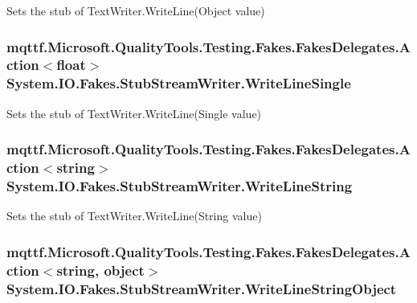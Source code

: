 Sets the stub of Text\-Writer.\-Write\-Line(\-Object value)

\hypertarget{class_system_1_1_i_o_1_1_fakes_1_1_stub_stream_writer_af2a2b9ba72906f1477432ea12d9e6abf}{
\subsubsection[{Write\-Line\-Single}]{\setlength{\rightskip}{0pt plus 5cm}mqttf.\-Microsoft.\-Quality\-Tools.\-Testing.\-Fakes.\-Fakes\-Delegates.\-Action$<$float$>$ System.\-I\-O.\-Fakes.\-Stub\-Stream\-Writer.\-Write\-Line\-Single}}\label{class_system_1_1_i_o_1_1_fakes_1_1_stub_stream_writer_af2a2b9ba72906f1477432ea12d9e6abf}


Sets the stub of Text\-Writer.\-Write\-Line(\-Single value)

\hypertarget{class_system_1_1_i_o_1_1_fakes_1_1_stub_stream_writer_a71f037719c8536f2738809bc03f3123f}{
\subsubsection[{Write\-Line\-String}]{\setlength{\rightskip}{0pt plus 5cm}mqttf.\-Microsoft.\-Quality\-Tools.\-Testing.\-Fakes.\-Fakes\-Delegates.\-Action$<$string$>$ System.\-I\-O.\-Fakes.\-Stub\-Stream\-Writer.\-Write\-Line\-String}}\label{class_system_1_1_i_o_1_1_fakes_1_1_stub_stream_writer_a71f037719c8536f2738809bc03f3123f}


Sets the stub of Text\-Writer.\-Write\-Line(\-String value)

\hypertarget{class_system_1_1_i_o_1_1_fakes_1_1_stub_stream_writer_aac2ac37aecb87ee398a0ed3ced1592e2}{
\subsubsection[{Write\-Line\-String\-Object}]{\setlength{\rightskip}{0pt plus 5cm}mqttf.\-Microsoft.\-Quality\-Tools.\-Testing.\-Fakes.\-Fakes\-Delegates.\-Action$<$string, object$>$ System.\-I\-O.\-Fakes.\-Stub\-Stream\-Writer.\-Write\-Line\-String\-Object}}\label{class_system_1_1_i_o_1_1_fakes_1_1_stub_stream_writer_aac2ac37aecb87ee398a0ed3ced1592e2}


